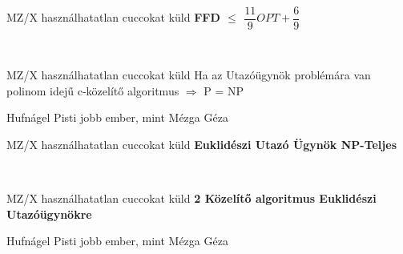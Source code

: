 	 \notBiz \\[0pt]

	 \begin{tetel}{MZ/X használhatatlan cuccokat küld}
    \textbf{FFD $\leq$ $\dfrac{11}{9} OPT + \dfrac{6}{9}$ } \\[3pt]
    \end{tetel}

	 \notBiz \\[0pt]


	 \begin{tetel}{MZ/X használhatatlan cuccokat küld}
    Ha az Utazóügynök problémára van polinom idejű c-közelítő algoritmus $\Rightarrow$ P = NP \\[3pt]
    \end{tetel}

	 \begin{bizonyitas}{Hufnágel Pisti jobb ember, mint Mézga Géza}
    \\[0pt] %
\end{bizonyitas}

	 \begin{tetel}{MZ/X használhatatlan cuccokat küld}
    \textbf{Euklidészi Utazó Ügynök NP-Teljes} \\[3pt]
    \end{tetel}

	 \notBiz \\[0pt]

	 \begin{tetel}{MZ/X használhatatlan cuccokat küld}
    \textbf{2 Közelítő algoritmus Euklidészi Utazóügynökre} \\[3pt]
    \end{tetel}

	 \begin{bizonyitas}{Hufnágel Pisti jobb ember, mint Mézga Géza}
    \\[0pt] %
\end{bizonyitas}
